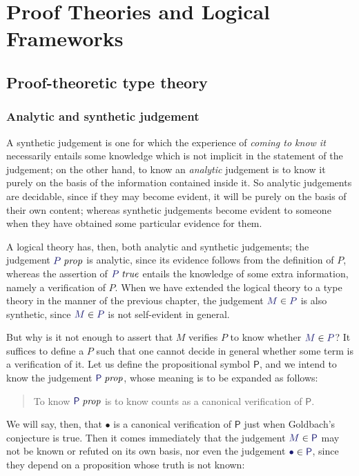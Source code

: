 \documentclass[main.tex]{subfiles}
\begin{document}
\onehalfspacing

\chapter{Proof Theories and Logical Frameworks}

\section{Proof-theoretic type theory}

\subsection{Analytic and synthetic judgement}

A synthetic judgement is one for which the experience of \emph{coming
to know it} necessarily entails some knowledge which is not implicit
in the statement of the judgement; on the other hand, to know an
\emph{analytic} judgement is to know it purely on the basis of the
information contained inside it. So analytic judgements are decidable,
since if they may become evident, it will be purely on the basis of
their own content; whereas synthetic judgements become evident to
someone when they have obtained some particular evidence for them.

A logical theory has, then, both analytic and synthetic judgements;
the judgement $\isprop{P}$ is analytic, since its evidence follows
from the definition of $P$, whereas the assertion of $\istrue{P}$
entails the knowledge of some extra information, namely a verification
of $P$. When we have extended the logical theory to a type theory in
the manner of the previous chapter, the judgement $\ver{M}{P}$ is
also synthetic, since $\ver{M}{P}$ is not self-evident in general.

But why is it not enough to assert that $M$ verifies $P$ to know
whether $\ver{M}{P}$? It suffices to define a $P$ such that one cannot
decide in general whether some term is a verification of it. Let us
define the propositional symbol $\mathsf{P}$, and we intend to know
the judgement $\isprop{\mathsf{P}}$, whose meaning is to be expanded as
follows:
\begin{quote}
  To know $\isprop{\mathsf{P}}$ is to know counts as a canonical verification of $\mathsf{P}$.
\end{quote}

We will say, then, that $\bullet$ is a canonical verification of
$\mathsf{P}$ just when Goldbach's conjecture is true. Then it comes
immediately that the judgement $\ver{M}{\mathsf{P}}$ may not be known
or refuted on its own basis, nor even the judgement
$\ver{\bullet}{\mathsf{P}}$, since they depend on a proposition whose
truth is not known:
\end{document}
